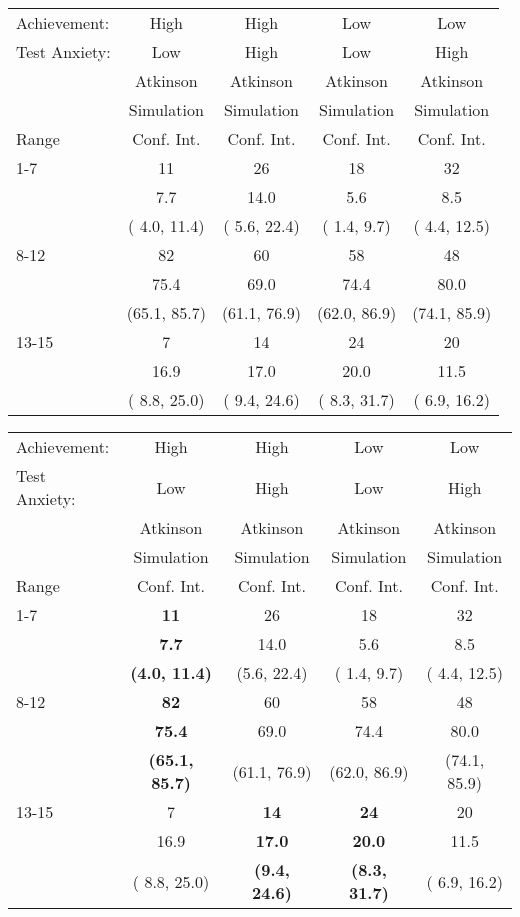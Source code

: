 \begin{tabular}{|l||c|c|c|c|} \hline 
Achievement: & High & High & Low & Low \\  
Test Anxiety: & Low & High & Low & High \\  \hline 
 & Atkinson & Atkinson & Atkinson & Atkinson \\ 
 & Simulation & Simulation & Simulation & Simulation \\ 
Range & Conf. Int. & Conf. Int. & Conf. Int. & Conf. Int. \\ \hline\hline 
1-7 & 11 & 26 & 18 & 32 \\ 
 &  7.7 & 14.0 &  5.6 &  8.5 \\ 
 & ( 4.0, 11.4) & ( 5.6, 22.4) & ( 1.4,  9.7) & ( 4.4, 12.5) \\ \hline 
8-12 & 82 & 60 & 58 & 48 \\ 
 & 75.4 & 69.0 & 74.4 & 80.0 \\ 
 & (65.1, 85.7) & (61.1, 76.9) & (62.0, 86.9) & (74.1, 85.9) \\ \hline 
13-15& 7 & 14 & 24 & 20 \\ 
 & 16.9 & 17.0 & 20.0 & 11.5 \\ 
 & ( 8.8, 25.0) & ( 9.4, 24.6) & ( 8.3, 31.7) & ( 6.9, 16.2) \\ \hline 
\end{tabular} 

\begin{tabular}{|l||c|c|c|c|} \hline 
Achievement: & High & High & Low & Low \\  
Test Anxiety: & Low & High & Low & High \\  \hline 
 & Atkinson & Atkinson & Atkinson & Atkinson \\ 
 & Simulation & Simulation & Simulation & Simulation \\ 
Range & Conf. Int. & Conf. Int. & Conf. Int. & Conf. Int. \\ \hline\hline 
  1-7 & \bf{11}           & 26              & 18           & 32 \\ 
      & \bf{7.7}          & 14.0            &  5.6         &  8.5 \\ 
      & \bf{(4.0, 11.4)}  & (5.6, 22.4)     & ( 1.4,  9.7) & ( 4.4, 12.5)\\ \hline 
8-12  & \bf{82}           & 60               & 58           & 48 \\ 
      & \bf{75.4}         & 69.0             & 74.4         & 80.0 \\ 
      & \bf{(65.1, 85.7)} & (61.1, 76.9)     & (62.0, 86.9) & (74.1, 85.9)\\ \hline 
13-15 & 7                 & \bf{14}           & \bf{24}           & 20 \\ 
      & 16.9              & \bf{17.0}         & \bf{20.0}         & 11.5 \\ 
      & ( 8.8, 25.0)      & \bf{(9.4, 24.6)}  & \bf{(8.3, 31.7)} & ( 6.9, 16.2)\\ \hline 
\end{tabular} 
